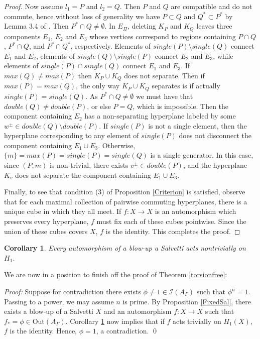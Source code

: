 \documentclass[11pt]{amsart}
\numberwithin{thm}{section}
\newtheorem{corollary}[thm]{Corollary}
\theoremstyle{remark}
\newtheorem{rmk}[thm]{Remark}
\theoremstyle{definition}
\newcommand{\Z}{\mathbb{Z}}
\newcommand{\Sa}{\mathbb{S}}
\newcommand{\Out}{\text{Out}}
\begin{document}
\begin{proof}
Now assume $l_1=P$ and $l_2=Q$.  Then $P$ and $Q$ are compatible and do not commute, hence without loss of generality we have $P\subset Q$ and $Q^*\subset P^*$ by Lemma 3.4 of \cite{CSV12}. Then $P^*\cap Q\neq \emptyset$.  In $E_\Pi$, deleting $K_P$ and $K_Q$ leaves three components $E_1$, $E_2$ and $E_3$ whose vertices correspond to regions containing $P\cap Q$, $P^*\cap Q$, and $P^*\cap Q^*$, respectively.  Elements of $single(P)\setminus single(Q)$ connect $E_1$ and $E_2$, elements of $single(Q)\setminus single(P)$ connect $E_2$ and $E_3$, while elements of $single(P)\cap single(Q)$ connect $E_1$ and $E_3$.  If $max(Q)\neq max(P)$ then $K_P\cup K_Q$ does not separate. Then if $max(P)=max(Q)$, the only way  $K_P\cup K_Q$ separates is if actually $single(P)=single(Q)$.  As $P^*\cap Q\neq \emptyset$ we must have that $double(Q)\neq double(P)$, or else $P=Q$, which is impossible.  Then the component containing $E_2$ has a non-separating hyperplane labeled by some $w^\pm\in double(Q)\setminus double(P)$.  If $single(P)$ is not a single element, then the hyperplane corresponding to any element of $single(P)$ does not disconnect the component containing $E_1\cup E_3$. Otherwise, $\{m\}=max(P)=single(P)=single(Q)$ is a single generator.  In this case, since $(P,m)$ is non-trivial, there exists $v^\pm\in double(P)$, and the hyperplane $K_v$ does not separate the component containing $E_1\cup E_3$. 

Finally, to see that condition (3) of Proposition \ref{Criterion} is satisfied, observe that for each maximal collection of pairwise commuting hyperplanes, there is a unique cube in which they all meet.  If $f:X\rightarrow X$ is an automorphism which preserves every hyperplane, $f$ must fix each of these cubes pointwise. Since the union of these cubes covers $X$, $f$ is the identity.  This completes the proof.  
\end{proof}

\begin{corollary} \label{nontrivial}Every automorphism of a blow-up a Salvetti acts nontrivially on $H_1$.
\end{corollary}
\noindent
We are now in a position to finish off the proof of Theorem \ref{torsionfree}:

\noindent
\emph{Proof:} Suppose for contradiction there exists $\phi\neq1\in \mathcal{I}(A_\Gamma)$ such that $\phi^n=1$. Passing to a power, we may assume $n$ is prime.  By Proposition \ref{FixedSal}, there exists a blow-up of a Salvetti $X$ and an automorphism $f:X\rightarrow X$ such that $f_*=\phi\in \Out(A_\Gamma)$. Corollary \ref{nontrivial} now implies that if $f$ acts trivially on $H_1(X)$, $f$ is the identity. Hence, $\phi=1$, a contradiction. \qed




\end{document}
